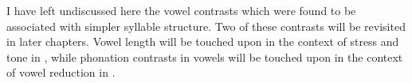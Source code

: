   I have left undiscussed here the vowel contrasts which were found to be associated with simpler syllable structure. Two of these contrasts will be revisited in later chapters. Vowel length will be touched upon in the context of stress and tone in , while phonation contrasts in vowels will be touched upon in the context of vowel reduction in .
